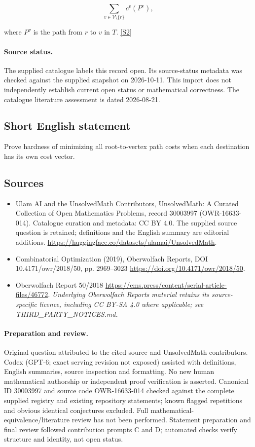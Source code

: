 \documentclass[11pt]{article}
\begin{document}
$$\sum_{v\in V\setminus\{r\}}c^v(P^v),$$

where $P^v$ is the path from $r$ to $v$ in $T$. \href{https://doi.org/10.4171/owr/2018/50}{[S2]}
\paragraph{Source status.}
The supplied catalogue labels this record open. Its source-status metadata was checked against the supplied snapshot on 2026-10-11. This import does not independently establish current open status or mathematical correctness. The catalogue literature assessment is dated 2026-08-21.
\subsection{Short English statement}
Prove hardness of minimizing all root-to-vertex path costs when each destination has its own cost vector.
\subsection{Sources}
\begin{itemize}
\item[S1] Ulam AI and the UnsolvedMath Contributors, UnsolvedMath: A Curated Collection of Open Mathematics Problems, record 30003997 (OWR-16633-014). Catalogue curation and metadata: CC BY 4.0. The supplied source question is retained; definitions and the English summary are editorial additions.
\url{https://huggingface.co/datasets/ulamai/UnsolvedMath}.
\item[S2] Combinatorial Optimization (2019), Oberwolfach Reports, DOI 10.4171/owr/2018/50, pp. 2969--3023
\url{https://doi.org/10.4171/owr/2018/50}.
\item[S3] Oberwolfach Report 50/2018
\url{https://ems.press/content/serial-article-files/46772}.
\textit{Underlying Oberwolfach Reports material retains its source-specific licence, including CC BY-SA 4.0 where applicable; see THIRD\_PARTY\_NOTICES.md.}
\end{itemize}
\paragraph{Preparation and review.}
Original question attributed to the cited source and UnsolvedMath contributors. Codex (GPT-6; exact serving revision not exposed) assisted with definitions, English summaries, source inspection and formatting. No new human mathematical authorship or independent proof verification is asserted. Canonical ID 30003997 and source code OWR-16633-014 checked against the complete supplied registry and existing repository statements; known flagged repetitions and obvious identical conjectures excluded. Full mathematical-equivalence/literature review has not been performed. Statement preparation and final review followed contribution prompts C and D; automated checks verify structure and identity, not open status.
\label{end:30003997}
\end{document}
